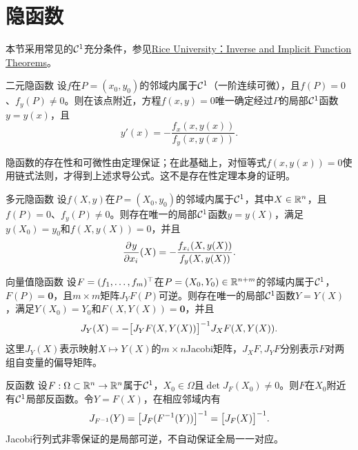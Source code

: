 \section{隐函数}
本节采用常见的$\mathcal{C}^1$充分条件，参见\href{https://math.rice.edu/~hardt/401F03/ift.pdf}{Rice University：Inverse and Implicit Function Theorems}。
\begin{theorem}{二元隐函数}{}
    设$f$在$P = (x_0,y_0)$的邻域内属于$\mathcal{C}^1$（一阶连续可微），且$f(P) = 0$、$f_y(P) \neq 0$。则在该点附近，方程$f(x,y) = 0$唯一确定经过$P$的局部$\mathcal{C}^1$函数$y = y(x)$，且
    \begin{equation}\label{eq:calc-implicit-scalar-derivative}
        y'(x) = -\frac{f_x(x,y(x))}{f_y(x,y(x))}.
    \end{equation}
\end{theorem}
隐函数的存在性和可微性由定理保证；在此基础上，对恒等式$f(x,y(x)) = 0$使用链式法则，才得到上述求导公式。这不是存在性定理本身的证明。
\begin{theorem}{多元隐函数}{}
    设$f(X,y)$在$P = (X_0,y_0)$的邻域内属于$\mathcal{C}^1$，其中$X \in \mathbb{R}^n$，且$f(P) = 0$、$f_y(P) \neq 0$。则存在唯一的局部$\mathcal{C}^1$函数$y = y(X)$，满足$y(X_0) = y_0$和$f(X,y(X)) = 0$，并且
    \begin{equation}\label{eq:calc-implicit-gradient}
        \frac{\partial^{}y}{\partial{x_i}^{}}(X) = -\frac{f_{x_i}(X,y(X))}{f_y(X,y(X))}.
    \end{equation}
\end{theorem}
\begin{theorem}{向量值隐函数}{}
    设$F = (f_1,\ldots,f_m)^\top$在$P = (X_0,Y_0) \in \mathbb{R}^{n+m}$的邻域内属于$\mathcal{C}^1$，$F(P) = \bm0$，且$m \times m$矩阵$J_YF(P)$可逆。则存在唯一的局部$\mathcal{C}^1$函数$Y = Y(X)$，满足$Y(X_0) = Y_0$和$F(X,Y(X)) = \bm0$，并且
    \begin{equation}\label{eq:calc-implicit-jacobian}
        J_Y(X) = -\bigl[J_YF(X,Y(X))\bigr]^{-1} J_XF(X,Y(X)).
    \end{equation}
    这里$J_Y(X)$表示映射$X \mapsto Y(X)$的$m \times n$Jacobi矩阵，$J_XF,J_YF$分别表示$F$对两组自变量的偏导矩阵。
\end{theorem}
\begin{theorem}{反函数}{}
    设$F:\Omega \subset \mathbb{R}^n \to \mathbb{R}^n$属于$\mathcal{C}^1$，$X_0 \in \Omega$且$\det J_F(X_0) \neq 0$。则$F$在$X_0$附近有$\mathcal{C}^1$局部反函数。令$Y = F(X)$，在相应邻域内有
    \begin{equation}\label{eq:calc-inverse-jacobian}
        J_{F^{-1}}(Y) = \bigl[J_F(F^{-1}(Y))\bigr]^{-1} = \bigl[J_F(X)\bigr]^{-1}.
    \end{equation}
    Jacobi行列式非零保证的是局部可逆，不自动保证全局一一对应。
\end{theorem}
